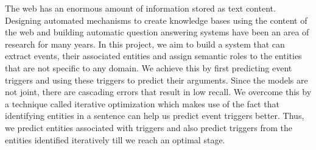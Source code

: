 The web has an enormous amount of information stored as text content. Designing automated mechanisms to create knowledge bases using the content of the web and building automatic question answering systems have been an area of research for many years. In this project, we aim to build a system that can extract events, their associated entities and assign semantic roles to the entities that are not specific to any domain. We achieve this by first predicting event triggers and using these triggers to predict their arguments. Since the models are not joint, there are cascading errors that result in low recall. We overcome this by a technique called iterative optimization which makes use of the fact that identifying entities in a sentence can help us predict event triggers better. Thus, we predict entities associated with triggers and also predict triggers from the entities identified iteratively till we reach an optimal stage.